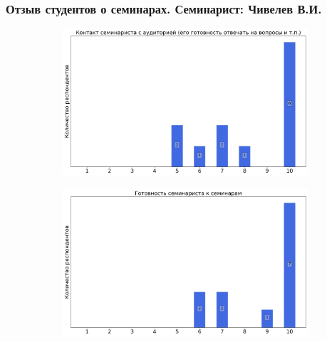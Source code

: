     \subsubsection{Отзыв студентов о семинарах. Семинарист: Чивелев В.И.}
        \begin{figure}[H]
            \centering
            \begin{subfigure}[b]{0.45\textwidth}
                \centering
                \includegraphics[width=\textwidth]{images/1 course/Общая физика - механика/seminarists-marks-Чивелев В.И.-0.png}
            \end{subfigure}
            \begin{subfigure}[b]{0.45\textwidth}
                \centering
                \includegraphics[width=\textwidth]{images/1 course/Общая физика - механика/seminarists-marks-Чивелев В.И.-1.png}
            \end{subfigure}
            \begin{subfigure}[b]{0.45\textwidth}
                \centering

\end{subfigure}
\end{figure}
